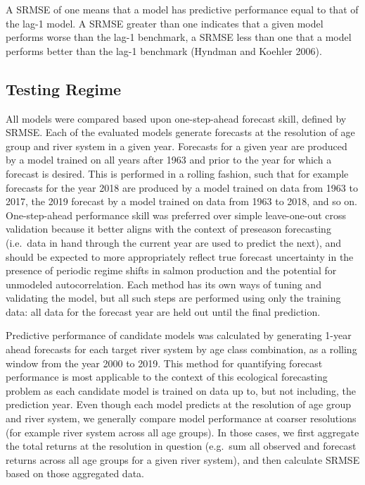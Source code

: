 \documentclass[
]{article}
\begin{document}
A SRMSE of one means that a model has predictive performance equal to that of the lag-1 model. A SRMSE greater than one indicates that a given model performs worse than the lag-1 benchmark, a SRMSE less than one that a model performs better than the lag-1 benchmark (Hyndman and Koehler 2006).

\hypertarget{testing-regime}{%
\subsection*{Testing Regime}\label{testing-regime}}

All models were compared based upon one-step-ahead forecast skill, defined by SRMSE. Each of the evaluated models generate forecasts at the resolution of age group and river system in a given year. Forecasts for a given year are produced by a model trained on all years after 1963 and prior to the year for which a forecast is desired. This is performed in a rolling fashion, such that for example forecasts for the year 2018 are produced by a model trained on data from 1963 to 2017, the 2019 forecast by a model trained on data from 1963 to 2018, and so on. One-step-ahead performance skill was preferred over simple leave-one-out cross validation because it better aligns with the context of preseason forecasting (i.e.~data in hand through the current year are used to predict the next), and should be expected to more appropriately reflect true forecast uncertainty in the presence of periodic regime shifts in salmon production and the potential for unmodeled autocorrelation. Each method has its own ways of tuning and validating the model, but all such steps are performed using only the training data: all data for the forecast year are held out until the final prediction.

Predictive performance of candidate models was calculated by generating 1-year ahead forecasts for each target river system by age class combination, as a rolling window from the year 2000 to 2019. This method for quantifying forecast performance is most applicable to the context of this ecological forecasting problem as each candidate model is trained on data up to, but not including, the prediction year. Even though each model predicts at the resolution of age group and river system, we generally compare model performance at coarser resolutions (for example river system across all age groups). In those cases, we first aggregate the total returns at the resolution in question (e.g.~sum all observed and forecast returns across all age groups for a given river system), and then calculate SRMSE based on those aggregated data.
\end{document}
